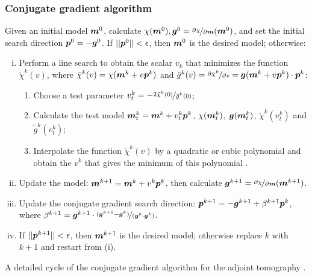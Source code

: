 \subsubsection{Conjugate gradient algorithm}
Given an initial model $\boldsymbol{m}^0$, calculate $\chi(\boldsymbol{m}^0),
\boldsymbol{g}^0=\nicefrac{\partial\chi}{\partial\boldsymbol{m}}(\boldsymbol{m}^0)$,
and set the initial search direction $\boldsymbol{p}^0=-\boldsymbol{g}^0$. If $||\boldsymbol{p}^0||<\epsilon$,
then $\boldsymbol{m}^0$ is the desired model;
otherwise:
\begin{enumerate}[(i)]
  \item Perform a line search to obtain the scalar $v_k$
    that minimizes the function $\tilde\chi^k(v)$,
    where $\tilde\chi^k(v)=\chi(\boldsymbol{m}^k+v\boldsymbol{p}^k)$ and
    $\tilde g^k(v)=\nicefrac{\partial\tilde\chi^k}{\partial v}=\boldsymbol{g}(\boldsymbol{m}^k+v\boldsymbol{p}^k)\cdot\boldsymbol{p}^k$:
  \begin{enumerate}[$\bullet$]
    \item Choose a test parameter $v_t^k=-\nicefrac{2\tilde\chi^k(0)}{\tilde g^k(0)}$;
    \item Calculate the test model $\boldsymbol{m}_t^k=\boldsymbol{m}^k+v_t^k\boldsymbol{p}^k$, $\chi(\boldsymbol{m}_t^k)$,
      $\boldsymbol{g}(\boldsymbol{m}_t^k)$, $\tilde\chi^k(v_t^k)$ and $\tilde g^k(v_t^k)$;
    \item Interpolate the function $\tilde\chi^k(v)$ by a quadratic or cubic polynomial
      and obtain the $v^k$ that gives the minimum of this polynomial
    .
  \end{enumerate}
  \item Update the model: $\boldsymbol{m}^{k+1}=\boldsymbol{m}^k+v^k\boldsymbol{p}^k$,
    then calculate $\boldsymbol{g}^{k+1}=\nicefrac{\partial\chi}{\partial\boldsymbol{m}}(\boldsymbol{m}^{k+1})$.
  \item Update the conjugate gradient search direction:
    $\boldsymbol{p}^{k+1}=-\boldsymbol{g}^{k+1}+\beta^{k+1}\boldsymbol{p}^k$, where
    $\beta^{k+1}=\boldsymbol{g}^{k+1}\cdot\nicefrac{(\boldsymbol{g}^{k+1}-\boldsymbol{g}^k)}{(\boldsymbol{g}^k\cdot\boldsymbol{g}^k)}$.
  \item If $||\boldsymbol{p}^{k+1}||<\epsilon$, then $\boldsymbol{m}^{k+1}$ is the desired model;
    otherwise replace $k$ with $k+1$ and restart from (i).
\end{enumerate}

A detailed cycle of the conjugate gradient algorithm for the adjoint tomography
.

